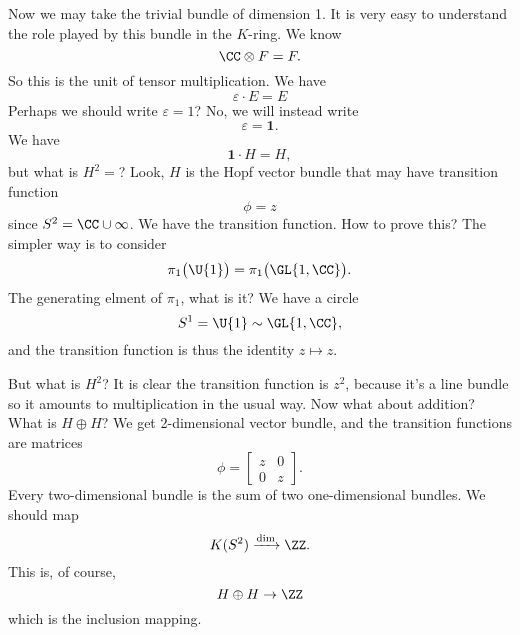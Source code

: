 Now we may take the trivial bundle of dimension 1. It is very easy to
understand the role played by this bundle in the $K$-ring. We
know
\begin{equation}
\CC\otimes F=F.
\end{equation}
So this is the unit of tensor multiplication. We have
\begin{equation}
\varepsilon\cdot E=E
\end{equation}
Perhaps we should write $\varepsilon=1$? No, we will instead
write
\begin{equation}
\varepsilon=\mathbf{1}.
\end{equation}
We have
\begin{equation}
\mathbf{1}\cdot H=H,
\end{equation}
but what is $H^{2}=$? Look, $H$ is the Hopf vector bundle that
may have transition function
\begin{equation}
\phi = z
\end{equation}
since $S^{2}=\CC\cup\infty$. We have the transition function. How
to prove this? The simpler way is to consider
\begin{equation}
\pi_{1}\bigl(\U{1}\bigr)=\pi_{1}\bigl(\GL{1,\CC}\bigr).
\end{equation}
The generating elment of $\pi_{1}$, what is it? We have a circle
\begin{equation}
S^{1}=\U{1}\homotopic\GL{1,\CC},
\end{equation}
and the transition function is thus the identity $z\mapsto z$.

But what is $H^{2}$? It is clear the transition function is
$z^{2}$, because it's a line bundle so it amounts to
multiplication in the usual way. Now what about addition? What is
$H\oplus H$? We get 2-dimensional vector bundle, and the
transition functions are matrices
\begin{equation}
\phi = \begin{bmatrix}z & 0\\0&z
\end{bmatrix}.
\end{equation}
Every two-dimensional bundle is the sum of two one-dimensional
bundles. We should map
\begin{equation}
K(S^{2})\xrightarrow{\dim}\ZZ.
\end{equation}
This is, of course,
\begin{equation}
H\oplus H\to\ZZ
\end{equation}
which is the inclusion mapping.

